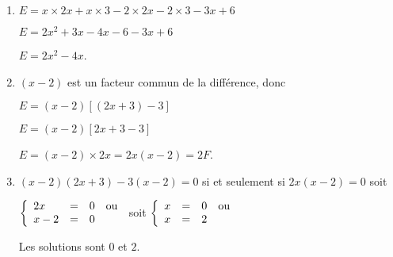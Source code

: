 
\medskip

\begin{enumerate}
\item $E = x \times 2x + x \times 3 - 2 \times 2x - 2 \times 3 - 3x + 6$

$E = 2x^2 + 3x - 4x - 6 - 3x + 6$

$E = 2x^2 - 4x$.
\item $(x - 2)$ est un facteur commun de la différence, donc

$E = (x - 2)[(2x + 3) - 3]$

$E = (x - 2 )[2x + 3 - 3]$

$E = (x - 2)\times 2x = 2x(x - 2) = 2F$.
\item $(x - 2)(2x + 3) - 3(x - 2) = 0$  si et seulement si $2x(x - 2) = 0$ soit

$\left\{\begin{array}{l c l}
2x 		&=& 0 \quad \text{ou}\\
x - 2 	&=& 0
\end{array}\right.$ soit $\left\{\begin{array}{l c l}
x &=& 0 \quad\text{ou}\\
x &=&2
\end{array}\right.$

Les solutions sont $0$ et $2$.
\end{enumerate}

\vspace{0,5cm}

